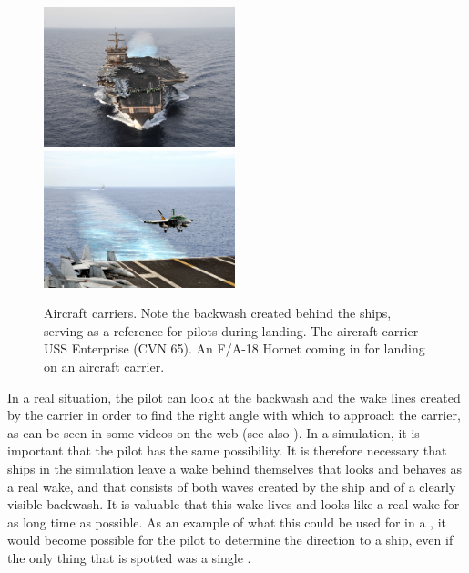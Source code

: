 \begin{figure}
    \centering
     {\includegraphics[width=0.495\textwidth]{Images/Public_domain/The_aircraft_carrier_USS_Enterprise_(CVN_65)}}
     {\includegraphics[width=0.495\textwidth]{Images/Public_domain/An_F-A-18C_Hornet_lands_on_the_aircraft_carrier_USS_George_Washington_(CVN_73)}}
    \caption{Aircraft carriers. Note the backwash created behind the ships, serving as a reference for pilots during landing.  The aircraft carrier USS Enterprise (CVN 65).  An F/A-18 Hornet coming in for landing on an aircraft carrier.}
    \label{fig:aircraft_carriers_and_backwash}
\end{figure}

In a real situation, the pilot can look at the backwash and the wake lines created by the carrier in order to find the right angle with which to approach the carrier, as can be seen in some videos on the web \citep{Alivewithpassion2007,MatteoBram2007} (see also ). In a simulation, it is important that the pilot has the same possibility. It is therefore necessary that ships in the simulation leave a wake behind themselves that looks and behaves as a real wake, and that consists of both waves created by the ship and of a clearly visible backwash. It is valuable that this wake lives and looks like a real wake for as long time as possible. As an example of what this could be used for in a , it would become possible for the pilot to determine the direction to a ship, even if the only thing that is spotted was a single .